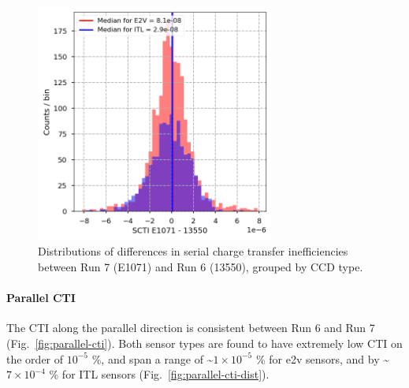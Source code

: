 \begin{figure}[H]
\begin{centering}
\includegraphics[width=0.7\textwidth]{figures/baselineCharacterization/SCTI_13550_E1071_diff.png}
\caption{Distributions of differences in serial charge transfer inefficiencies between Run 7 (E1071) and Run 6 (13550), grouped by CCD type.}
\label{fig:serial-cti-dist}
\end{centering}
\end{figure}

\paragraph{Parallel CTI}\label{parallel-cti}

The CTI along the parallel direction is consistent between Run 6 and
Run 7 (Fig.~\ref{fig:parallel-cti}). Both sensor types are found to have extremely low CTI on the order of $10^{-5}$ \%,
and span a range of \textasciitilde$1 \times 10^{-5}$ \% for e2v sensors, and
by \textasciitilde$7 \times 10^{-4}$ \% for ITL sensors (Fig.~\ref{fig:parallel-cti-dist}).


